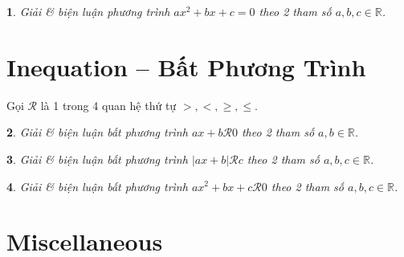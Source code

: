 \documentclass{article}
\newtheorem{baitoan}{}
\begin{document}
\begin{baitoan}
	Giải \& biện luận phương trình $ax^2 + bx + c = 0$ theo 2 tham số $a,b,c\in\mathbb{R}$.
\end{baitoan}


\section{Inequation -- Bất Phương Trình}
Gọi $\mathcal{R}$ là 1 trong 4 quan hệ thứ tự $>,<,\ge,\le$.

\begin{baitoan}
	Giải \& biện luận bất phương trình $ax + b\mathcal{R} 0$ theo 2 tham số $a,b\in\mathbb{R}$.
\end{baitoan}

\begin{baitoan}
	Giải \& biện luận bất phương trình $|ax + b|\mathcal{R} c$ theo 2 tham số $a,b,c\in\mathbb{R}$.
\end{baitoan}

\begin{baitoan}
	Giải \& biện luận bất phương trình $ax^2 + bx + c\mathcal{R} 0$ theo 2 tham số $a,b,c\in\mathbb{R}$.
\end{baitoan}


\section{Miscellaneous}


\printbibliography[heading=bibintoc]
	
\end{document}

